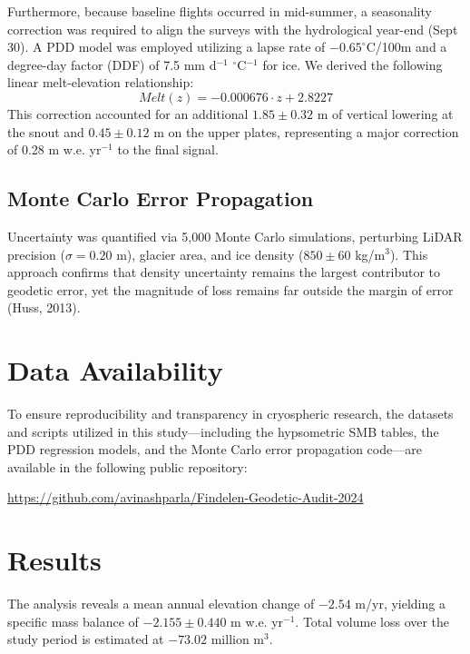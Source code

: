 \documentclass[12pt, a4paper]{article}
\begin{document}
	Furthermore, because baseline flights occurred in mid-summer, a seasonality correction was required to align the surveys with the hydrological year-end (Sept 30). A PDD model was employed utilizing a lapse rate of $-0.65^\circ$C/100m and a degree-day factor (DDF) of 7.5 mm d$^{-1}$ $^\circ$C$^{-1}$ for ice. We derived the following linear melt-elevation relationship:
	\begin{equation}
		Melt(z) = -0.000676 \cdot z + 2.8227
	\end{equation}
	This correction accounted for an additional $1.85 \pm 0.32$ m of vertical lowering at the snout and $0.45 \pm 0.12$ m on the upper plates, representing a major correction of 0.28 m w.e. yr$^{-1}$ to the final signal.
	
	\subsection{Monte Carlo Error Propagation}
	Uncertainty was quantified via 5,000 Monte Carlo simulations, perturbing LiDAR precision ($\sigma = 0.20$ m), glacier area, and ice density ($850 \pm 60$ kg/m$^3$). This approach confirms that density uncertainty remains the largest contributor to geodetic error, yet the magnitude of loss remains far outside the margin of error (Huss, 2013).
	
	\section{Data Availability}
	To ensure reproducibility and transparency in cryospheric research, the datasets and scripts utilized in this study---including the hypsometric SMB tables, the PDD regression models, and the Monte Carlo error propagation code---are available in the following public repository:
	\begin{center}
		\url{https://github.com/avinashparla/Findelen-Geodetic-Audit-2024}
	\end{center}
	
	\section{Results}
	The analysis reveals a mean annual elevation change of $-2.54$ m/yr, yielding a specific mass balance of $-2.155 \pm 0.440$ m w.e. yr$^{-1}$. Total volume loss over the study period is estimated at $-73.02$ million m$^3$.
	
\end{document}
